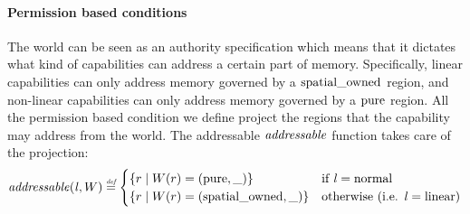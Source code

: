 \begin{jversion}

\paragraph{Permission based conditions}
\label{par:perm-cond}

The world can be seen as an authority specification which means that it dictates what kind of capabilities can address a certain part of memory.
Specifically, linear capabilities can only address memory governed by a $\mathrm{spatial\_owned}$ region, and non-linear capabilities can only address memory governed by a $\mathrm{pure}$ region.
All the permission based condition we define project the regions that the capability may address from the world.
The addressable $\addressable{}$ function takes care of the projection:
\[
  \addressable{\lin,W} \defeq
  \begin{cases}
    \{ r \mid W(r) = (\pure,\_) \} & \text{if $\lin = \normal$} \\
    \{ r \mid W(r) = (\spatialo,\_) \}  & \text{otherwise (i.e. $\lin = \linear$)} \\
  \end{cases}
\]


\end{jversion}
